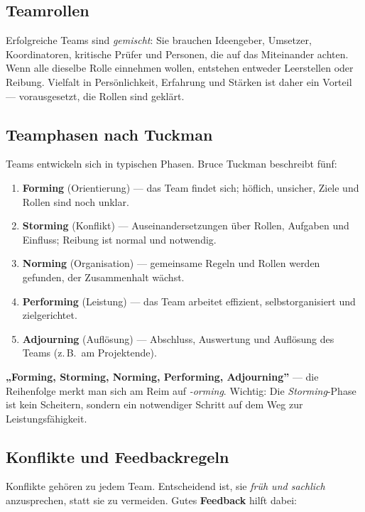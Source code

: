 \documentclass[11pt, a4paper]{article}
\begin{document}
\subsection{Teamrollen}

Erfolgreiche Teams sind \emph{gemischt}: Sie brauchen Ideengeber, Umsetzer, Koordinatoren,
kritische Prüfer und Personen, die auf das Miteinander achten. Wenn alle dieselbe Rolle
einnehmen wollen, entstehen entweder Leerstellen oder Reibung. Vielfalt in Persönlichkeit,
Erfahrung und Stärken ist daher ein Vorteil --- vorausgesetzt, die Rollen sind geklärt.

\subsection{Teamphasen nach Tuckman}

Teams entwickeln sich in typischen Phasen. Bruce Tuckman beschreibt fünf:

\begin{enumerate}
  \item \textbf{Forming} (Orientierung) --- das Team findet sich; höflich, unsicher,
    Ziele und Rollen sind noch unklar.
  \item \textbf{Storming} (Konflikt) --- Auseinandersetzungen über Rollen, Aufgaben und
    Einfluss; Reibung ist normal und notwendig.
  \item \textbf{Norming} (Organisation) --- gemeinsame Regeln und Rollen werden gefunden,
    der Zusammenhalt wächst.
  \item \textbf{Performing} (Leistung) --- das Team arbeitet effizient, selbstorganisiert
    und zielgerichtet.
  \item \textbf{Adjourning} (Auflösung) --- Abschluss, Auswertung und Auflösung des Teams
    (z.\,B.\ am Projektende).
\end{enumerate}

\begin{eselsbruecke}
\textbf{„Forming, Storming, Norming, Performing, Adjourning”} --- die Reihenfolge merkt
man sich am Reim auf \emph{-orming}. Wichtig: Die \emph{Storming}-Phase ist kein
Scheitern, sondern ein notwendiger Schritt auf dem Weg zur Leistungsfähigkeit.
\end{eselsbruecke}

\subsection{Konflikte und Feedbackregeln}

Konflikte gehören zu jedem Team. Entscheidend ist, sie \emph{früh und sachlich}
anzusprechen, statt sie zu vermeiden. Gutes \textbf{Feedback} hilft dabei:
\end{document}
